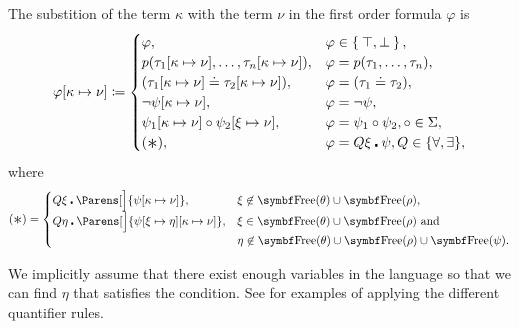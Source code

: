 \begin{definition}
\begin{DefEnum}
     The substition of the term \( \kappa \) with the term \( \nu \) in the first order formula \( \varphi \) is
    \begin{equation}\label{eq:def:first_order_substition/term_in_formula}
      \varphi[\kappa \mapsto \nu] \coloneqq \begin{cases}
        \varphi,                                                                       &\varphi \in \Set{ \top, \bot }, \\
        p(\tau_1[\kappa \mapsto \nu], \ldots, \tau_n[\kappa \mapsto \nu]),             &\varphi = p(\tau_1, \ldots, \tau_n), \\
        (\tau_1[\kappa \mapsto \nu] \doteq \tau_2[\kappa \mapsto \nu]),                &\varphi = (\tau_1 \doteq \tau_2), \\
        \neg \psi[\kappa \mapsto \nu],                                                 &\varphi = \neg \psi, \\
        \psi_1[\kappa \mapsto \nu] \circ \psi_2[\xi \mapsto \nu],                      &\varphi = \psi_1 \circ \psi_2, \circ \in \Sigma, \\
        (\Ast),                                                                        &\varphi = Q \xi \centerdot \psi, Q \in \{ \forall, \exists \},
      \end{cases}
    \end{equation}
    where
    \begin{equation}\label{eq:def:first_order_substition/term_in_formula/quantifiers}
      (\Ast) = \begin{cases}
        Q \xi \centerdot \Parens[\Big]{\psi[\kappa \mapsto \nu]},                      &\xi \not\in \Bold{Free}(\theta) \cup \Bold{Free}(\rho), \\
        Q \eta \centerdot \Parens[\Big]{\psi[\xi \mapsto \eta][\kappa \mapsto \nu]},   &\xi \in \Bold{Free}(\theta) \cup \Bold{Free}(\rho) \T{and} \\
                                                                                       &\eta \not\in \Bold{Free}(\theta) \cup \Bold{Free}(\rho) \cup \Bold{Free}(\psi).
      \end{cases}
    \end{equation}

    We implicitly assume that there exist enough variables in the language so that we can find \( \eta \) that satisfies the condition. See  for examples of applying the different quantifier rules.


\end{DefEnum}
\end{definition}

